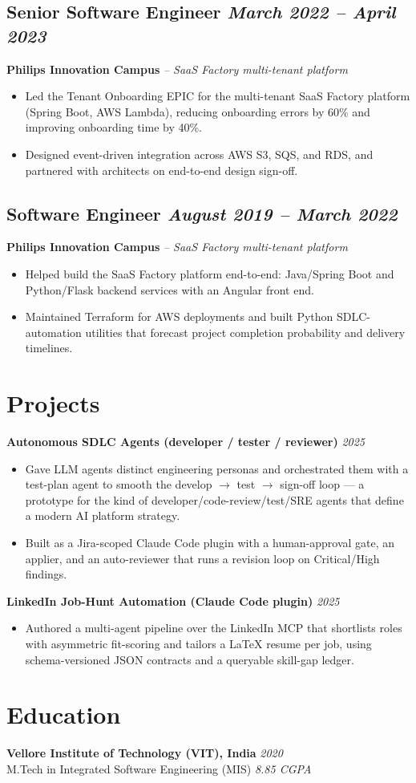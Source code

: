 \documentclass[11pt,a4paper]{article}
\begin{document}
\subsection{Senior Software Engineer \hfill \textit{March 2022 -- April 2023}}
\textbf{Philips Innovation Campus} \quad \textit{-- SaaS Factory multi-tenant platform}
\begin{itemize}
    \item Led the Tenant Onboarding EPIC for the multi-tenant SaaS Factory platform (Spring Boot, AWS Lambda), reducing onboarding errors by 60\% and improving onboarding time by 40\%.
    \item Designed event-driven integration across AWS S3, SQS, and RDS, and partnered with architects on end-to-end design sign-off.
\end{itemize}

\subsection{Software Engineer \hfill \textit{August 2019 -- March 2022}}
\textbf{Philips Innovation Campus} \quad \textit{-- SaaS Factory multi-tenant platform}
\begin{itemize}
    \item Helped build the SaaS Factory platform end-to-end: Java/Spring Boot and Python/Flask backend services with an Angular front end.
    \item Maintained Terraform for AWS deployments and built Python SDLC-automation utilities that forecast project completion probability and delivery timelines.
\end{itemize}

\section{Projects}
\noindent\textbf{Autonomous SDLC Agents (developer / tester / reviewer)} \hfill \textit{2025}
\begin{itemize}
    \item Gave LLM agents distinct engineering personas and orchestrated them with a test-plan agent to smooth the develop $\rightarrow$ test $\rightarrow$ sign-off loop --- a prototype for the kind of developer/code-review/test/SRE agents that define a modern AI platform strategy.
    \item Built as a Jira-scoped Claude Code plugin with a human-approval gate, an applier, and an auto-reviewer that runs a revision loop on Critical/High findings.
\end{itemize}
\noindent\textbf{LinkedIn Job-Hunt Automation (Claude Code plugin)} \hfill \textit{2025}
\begin{itemize}
    \item Authored a multi-agent pipeline over the LinkedIn MCP that shortlists roles with asymmetric fit-scoring and tailors a LaTeX resume per job, using schema-versioned JSON contracts and a queryable skill-gap ledger.
\end{itemize}

\section{Education}
\noindent\textbf{Vellore Institute of Technology (VIT), India} \hfill \textit{2020}\\
M.Tech in Integrated Software Engineering (MIS) \hfill \textit{8.85 CGPA}
\end{document}
